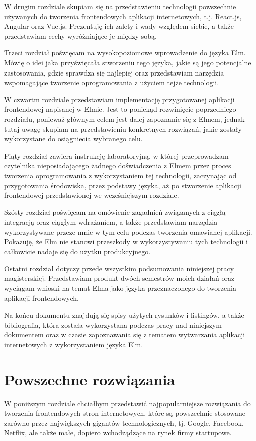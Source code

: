 \documentclass[twoside,a4paper]{report}
\begin{document}
W drugim rozdziale skupiam się na przedstawieniu technologii powszechnie używanych do tworzenia frontendowych aplikacji internetowych, t.j. React.js, Angular oraz Vue.js.
Prezentuję ich zalety i wady względem siebie, a także przedstawiam cechy wyróżniające je między sobą.

Trzeci rozdział poświęcam na wysokopoziomowe wprowadzenie do języka Elm.
Mówię o idei jaka przyświęcała stworzeniu tego języka, jakie są jego potencjalne zastosowania, gdzie sprawdza się najlepiej oraz przedstawiam narzędzia wspomagające tworzenie oprogramowania z użyciem tejże technologii.

W czwartm rozdziale przedstawiam implementację przygotowanej aplikacji frontendowej napisanej w Elmie.
Jest to poniekąd rozwinięcie poprzedniego rozdziału, ponieważ głównym celem jest dalej zapoznanie się z Elmem, jednak tutaj uwagę skupiam na przedstawieniu konkretnych rozwiązań, jakie zostały wykorzystane do osiągniecia wybranego celu.

Piąty rozdział zawiera instrukcję laboratoryjną, w której przeprowadzam czytelnika nieposiadającego żadnego doświadczenia z Elmem przez proces tworzenia oprogramowania z wykorzystaniem tej technologii, zaczynając od przygotowania środowiska, przez podstawy języka, aż po stworzenie aplikacji frontendowej przedstawionej we wcześniejszym rozdziale.

Szósty rozdział poświęcam na omówienie zagadnień związanych z ciągłą integracją oraz ciągłym wdrażaniem, a także przedstawiam narzędzia wykorzystywane przeze mnie w tym celu podczas tworzenia omawianej aplikacji.
Pokazuję, że Elm nie stanowi przeszkody w wykorzystywaniu tych technologii i całkowicie nadaje się do użytku produkcyjnego.

Ostatni rozdział dotyczy przede wszystkim podsumowania niniejszej pracy magisterskiej.
Przedstawiam produkt dwóch semestrów moich działań oraz wyciągam wnioski na temat Elma jako języka przeznaczonego do tworzenia aplikacji frontendowych.

Na końcu dokumentu znajdują się spisy użytych rysunków i listingów, a także bibliografia, która została wykorzystana podczas pracy nad niniejszym dokumentem oraz w czasie zapoznawania się z tematem wytwarzania aplikacji internetowych z wykorzystaniem języka Elm.


\chapter{Powszechne rozwiązania}
W poniższym rozdziale chciałbym przedstawić najpopularniejsze rozwiązania do tworzenia frontendowych stron internetowych, które są powszechnie stosowane zarówno przez największych gigantów technologicznych, tj. Google, Facebook, Netflix, ale także małe, dopiero wchodządzące na rynek firmy startupowe.
\end{document}
